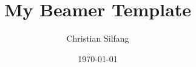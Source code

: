 \documentclass[aspectratio=1610]{beamer}
\title{My Beamer Template}
\date{\today}
\author{Christian Silfang}
\begin{document}
\begin{frame}
\titlepage
\end{frame}
\end{document}
